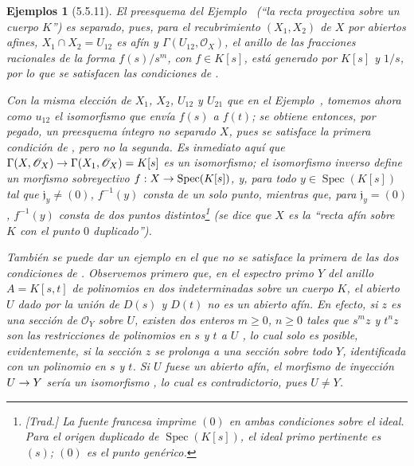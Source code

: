 \documentclass[oneside]{amsart}
\theoremstyle{ega-env-style}
\theoremstyle{ega-thm-env-style}
\theoremstyle{ega-defn-env-style}
\newtheorem*{examples}{Ejemplos}
\def\geq{\geqslant}                 %
\def\Spec{\operatorname{Spec}}
\renewcommand{\to}{\mathchoice{\longrightarrow}{\rightarrow}{\rightarrow}{\rightarrow}}
\let\EGAOriginalLabel\label
\renewcommand{\label}[1]{\phantomsection\EGAOriginalLabel{#1}}
\begin{document}
\begin{examples}[5.5.11]
\label{I.5.5.11}
El preesquema del Ejemplo~ (``la recta proyectiva sobre un cuerpo $K$'') es \emph{separado}, pues, para el recubrimiento $(X_1,X_2)$ de $X$ por abiertos afines, $X_1\cap X_2=U_{12}$ es afín y $\Gamma(U_{12},\mathscr{O}_X)$, el anillo de las fracciones racionales de la forma $f(s)/s^m$, con $f\in K[s]$, está generado por $K[s]$ y $1/s$, por lo que se satisfacen las condiciones de .

Con la misma elección de $X_1$, $X_2$, $U_{12}$ y $U_{21}$ que en el Ejemplo~, tomemos ahora como $u_{12}$ el isomorfismo que envía $f(s)$ a $f(t)$;
se obtiene entonces, por pegado, un preesquema \emph{íntegro no separado} $X$, pues se satisface la primera condición de , pero no la segunda.
Es inmediato aquí que $\Gamma(X,\mathscr{O}_X)\to\Gamma(X_1,\mathscr{O}_X)=K[s]$ es un isomorfismo;
el isomorfismo inverso define un morfismo sobreyectivo $f:X\to\operatorname{Spec}(K[s])$, y, para todo $y\in\operatorname{Spec}(K[s])$ tal que $\mathfrak{j}_y\neq(0)$, $f^{-1}(y)$ consta de un solo punto, mientras que, para $\mathfrak{j}_y=(0)$, $f^{-1}(y)$ consta de \emph{dos} puntos distintos\footnote{\emph{[Trad.] La fuente francesa imprime $(0)$ en ambas condiciones sobre el ideal. Para el origen duplicado de $\Spec(K[s])$, el ideal primo pertinente es $(s)$; $(0)$ es el punto genérico.}} (se dice que $X$ es la ``recta afín sobre $K$ con el punto $0$ duplicado'').

También se puede dar un ejemplo en el que no se satisface la primera de las dos condiciones de .
Observemos primero que, en el espectro primo $Y$ del anillo $A=K[s,t]$ de polinomios en dos indeterminadas sobre un cuerpo $K$, el abierto $U$ dado por la unión de $D(s)$ y $D(t)$ \emph{no es un abierto afín}.
En efecto, si $z$ es una sección de $\mathscr{O}_Y$ sobre $U$, existen dos enteros $m\geq0$, $n\geq0$ tales que $s^m z$ y $t^n z$ son las restricciones de polinomios en $s$ y $t$ a $U$ , lo cual solo es posible, evidentemente, si la sección $z$ se prolonga a una sección sobre todo $Y$, identificada con un polinomio en $s$ y $t$.
Si $U$ fuese un abierto afín, el morfismo de inyección $U\to Y$ sería un isomorfismo , lo cual es contradictorio, pues $U\neq Y$.


\end{examples}
\end{document}
